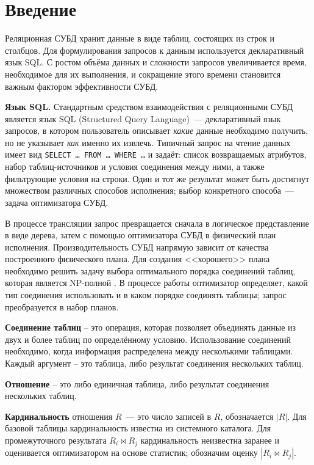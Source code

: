 \section{Введение}


Реляционная СУБД хранит данные в виде таблиц, состоящих из строк и столбцов.
Для формулирования запросов к данным используется декларативный язык SQL.
С ростом объёма данных и сложности запросов увеличивается время, необходимое
для их выполнения, и сокращение этого времени становится важным фактором
эффективности СУБД.
\par

\textbf{Язык SQL.}
Стандартным средством взаимодействия с реляционными СУБД является язык SQL
(Structured Query Language)~--- декларативный язык запросов,
в котором пользователь описывает \emph{какие} данные необходимо получить,
но не указывает \emph{как} именно их извлечь.
Типичный запрос на чтение данных имеет вид
\texttt{SELECT~\ldots\ FROM~\ldots\ WHERE~\ldots} и задаёт: список возвращаемых
атрибутов, набор таблиц-источников и условия соединения между ними,
а также фильтрующие условия на строки.
Один и тот же результат может быть достигнут множеством различных способов
исполнения; выбор конкретного способа~--- задача оптимизатора СУБД.
\par

В процессе трансляции запрос превращается сначала в логическое представление в виде дерева, 
затем с помощью оптимизатора СУБД в физический план исполнения. Производительность СУБД напрямую зависит от качества
построенного физического плана. Для создания <<хорошего>> плана необходимо решить задачу выбора
оптимального порядка соединений таблиц, которая является NP-полной \cite{IK}.
В процессе работы оптимизатор определяет, какой тип соединения использовать
и в каком порядке соединять таблицы; запрос преобразуется в набор планов.
\par

\textbf{Соединение таблиц} -- это операция, которая позволяет объединять данные
из двух и более таблиц по определённому условию. Использование соединений необходимо,
когда информация распределена между несколькими таблицами. Каждый аргумент -- это таблица, либо результат соединения нескольких 
таблиц.
\par

\textbf{Отношение} -- это либо единичная таблица, либо результат соединения нескольких таблиц.
\par

\textbf{Кардинальность} отношения $R$~--- это число записей в $R$, обозначается $|R|$.
Для базовой таблицы кардинальность известна из системного каталога.
Для промежуточного результата $R_i \Join R_j$ кардинальность неизвестна заранее
и оценивается оптимизатором на основе статистик; обозначим оценку $|R_i \Join R_j|$.
\par

